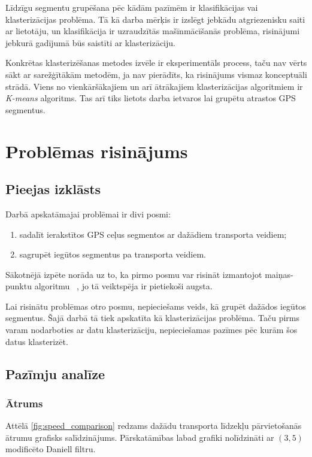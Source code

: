 \documentclass{ludis}
\begin{document}
Līdzīgu segmentu grupēšana pēc kādām pazīmēm ir klasifikācijas vai klasterizācijas problēma. Tā kā
darba mērķis ir izslēgt jebkādu atgriezenisku saiti ar lietotāju, un klasifikācija ir uzraudzītās
mašīnmācīšanās problēma, risinājumi jebkurā gadījumā būs saistīti ar klasterizāciju.

Konkrētas klasterizēšanas metodes izvēle ir eksperimentāls process, taču nav vērts sākt ar 
sarežģītākām metodēm, ja nav pierādīts, ka risinājums vismaz konceptuāli strādā. Viens
no vienkāršākajiem un arī ātrākajiem klasterizācijas algoritmiem ir \emph{K-means} algoritms.
Tas arī tiks lietots darba ietvaros lai grupētu atrastos GPS segmentus.

\chapter{Problēmas risinājums}
\section{Pieejas izklāsts}
Darbā apskatāmajai problēmai ir divi posmi:
\begin{enumerate}
\item sadalīt ierakstītos GPS ceļus segmentos ar dažādiem transporta veidiem;
\item sagrupēt iegūtos segmentus pa transporta veidiem.
\end{enumerate}

Sākotnējā izpēte norāda uz to, ka pirmo posmu var risināt izmantojot maiņas-punktu algoritmu 
~\cite{zheng_gps_segmentation}, jo tā veiktspēja ir pietiekoši augsta.

Lai risinātu problēmas otro posmu, nepieciešams veids, kā grupēt dažādos iegūtos segmentus.
Šajā darbā tā tiek apskatīta kā klasterizācijas problēma. Taču pirms varam nodarboties ar 
datu klasterizāciju, nepieciešamas pazīmes pēc kurām šos datus klasterizēt.

\section{Pazīmju analīze}
\subsection{Ātrums}
Attēlā \ref{fig:speed_comparison} redzams dažādu transporta līdzekļu pārvietošanās ātrumu grafisks
salīdzinājums. Pārskatāmības labad grafiki nolīdzināti ar $(3, 5)$ modificēto Daniell filtru.
\end{document}
